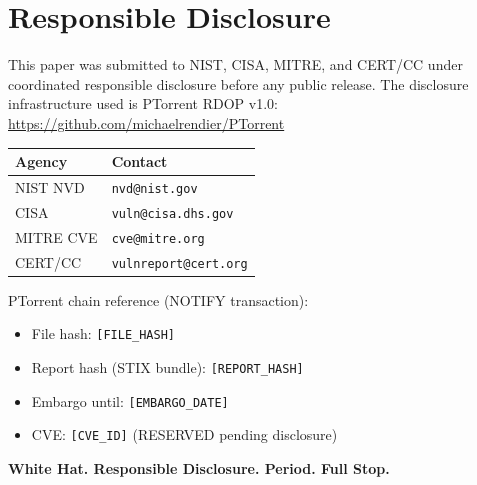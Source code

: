 \documentclass[runningheads]{llncs}
\theoremstyle{plain}
\theoremstyle{definition}
\begin{document}
\section{Responsible Disclosure}
\label{app:disclosure}

This paper was submitted to NIST, CISA, MITRE, and CERT/CC under
coordinated responsible disclosure before any public release.
The disclosure infrastructure used is PTorrent RDOP v1.0:
\url{https://github.com/michaelrendier/PTorrent}

\begin{center}
\begin{tabular}{ll}
\toprule
Agency & Contact \\
\midrule
NIST NVD & \texttt{nvd@nist.gov} \\
CISA & \texttt{vuln@cisa.dhs.gov} \\
MITRE CVE & \texttt{cve@mitre.org} \\
CERT/CC & \texttt{vulnreport@cert.org} \\
\bottomrule
\end{tabular}
\end{center}

PTorrent chain reference (NOTIFY transaction):
\begin{itemize}
\item File hash: \texttt{[FILE\_HASH]}
\item Report hash (STIX bundle): \texttt{[REPORT\_HASH]}
\item Embargo until: \texttt{[EMBARGO\_DATE]}
\item CVE: \texttt{[CVE\_ID]} (RESERVED pending disclosure)
\end{itemize}

\textbf{White Hat. Responsible Disclosure. Period. Full Stop.}
\end{document}
